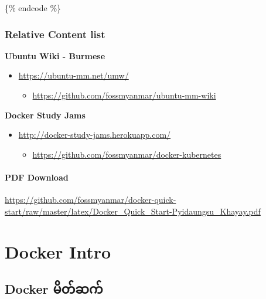 \{\% endcode \%\}

\hypertarget{relative-content-list}{%
\subsubsection{Relative Content list}\label{relative-content-list}}

\textbf{Ubuntu Wiki - Burmese}

\begin{itemize}
\tightlist
\item
  \url{https://ubuntu-mm.net/umw/}

  \begin{itemize}
  \tightlist
  \item
    \url{https://github.com/fossmyanmar/ubuntu-mm-wiki}
  \end{itemize}
\end{itemize}

\textbf{Docker Study Jams}

\begin{itemize}
\tightlist
\item
  \url{http://docker-study-jams.herokuapp.com/}

  \begin{itemize}
  \tightlist
  \item
    \url{https://github.com/fossmyanmar/docker-kubernetes}
  \end{itemize}
\end{itemize}

\hypertarget{pdf-download}{%
\paragraph{PDF Download}\label{pdf-download}}

\url{https://github.com/fossmyanmar/docker-quick-start/raw/master/latex/Docker_Quick_Start-Pyidaungsu_Khayay.pdf}

\pagebreak

\hypertarget{docker-intro-1}{%
\section{Docker Intro}\label{docker-intro-1}}

\hypertarget{docker-ux1019ux102dux1010ux103aux1006ux1000ux103a-1}{%
\subsection{Docker
မိတ်ဆက်}\label{docker-ux1019ux102dux1010ux103aux1006ux1000ux103a-1}}

